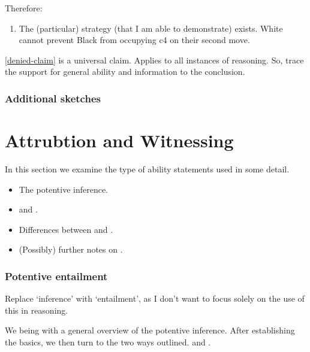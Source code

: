 \documentclass[10pt]{article}
\begin{document}
\begin{note}
  Therefore:

  \begin{enumerate}[resume, label=(S\arabic*), ref=(S\arabic*)]
  \item\label{inf:sse} The (particular) strategy (that I am able to demonstrate) exists.\newline
    White cannot prevent Black from occupying c4 on their second move.
  \end{enumerate}
\end{note}

\begin{note}
  \ref{denied-claim} is a universal claim.
  Applies to all instances of reasoning.
  So, trace the support for general ability and information to the conclusion.
\end{note}

\subsubsection{Additional sketches}
\label{sec:additional-sketches}


\section{Attrubtion and Witnessing}
\label{sec:attr-witn}

\begin{note}[Overview]
  In this section we examine the type of ability statements used in some detail.

  \begin{itemize}
  \item The potentive inference.
  \item \AR{} and \WR{}.
  \item Differences between \AR{} and \WR{}.
  \item (Possibly) further notes on \WR{}.
  \end{itemize}
\end{note}

\subsubsection{Potentive entailment}
\label{sec:potentive-entailment}

{
  \color{red}
  Replace `inference' with `entailment', as I don't want to focus solely on the use of this in reasoning.
}

\begin{note}[Overview]
  We being with a general overview of the potentive inference.
  After establishing the basics, we then turn to the two ways outlined.
  \AR{} and \WR{}.
\end{note}
\end{document}

